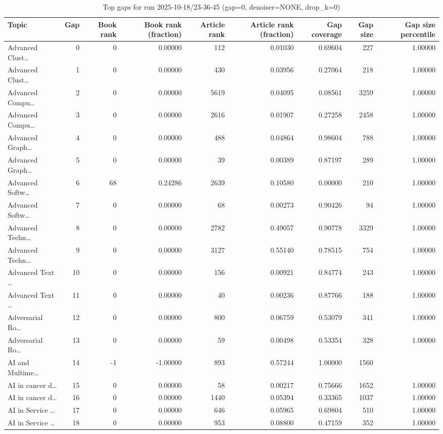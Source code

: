 \begin{table}
\caption{Top gaps for run 2025-10-18/23-36-45 (gap=0, denoiser=NONE, drop\_k=0)}
\label{tab:best_run_gap0_2025_10_18_23_36_45}
\begin{tabular}{lrrrrrrrr}
\toprule
Topic & Gap & Book rank & Book rank (fraction) & Article rank & Article rank (fraction) & Gap coverage & Gap size & Gap size percentile \\
\midrule
Advanced Clust… & 0 & 0 & 0.00000 & 112 & 0.01030 & 0.69604 & 227 & 1.00000 \\
Advanced Clust… & 1 & 0 & 0.00000 & 430 & 0.03956 & 0.27064 & 218 & 1.00000 \\
Advanced Compu… & 2 & 0 & 0.00000 & 5619 & 0.04095 & 0.08561 & 3259 & 1.00000 \\
Advanced Compu… & 3 & 0 & 0.00000 & 2616 & 0.01907 & 0.27258 & 2458 & 1.00000 \\
Advanced Graph… & 4 & 0 & 0.00000 & 488 & 0.04864 & 0.98604 & 788 & 1.00000 \\
Advanced Graph… & 5 & 0 & 0.00000 & 39 & 0.00389 & 0.87197 & 289 & 1.00000 \\
Advanced Softw… & 6 & 68 & 0.24286 & 2639 & 0.10580 & 0.00000 & 210 & 1.00000 \\
Advanced Softw… & 7 & 0 & 0.00000 & 68 & 0.00273 & 0.90426 & 94 & 1.00000 \\
Advanced Techn… & 8 & 0 & 0.00000 & 2782 & 0.49057 & 0.90778 & 3329 & 1.00000 \\
Advanced Techn… & 9 & 0 & 0.00000 & 3127 & 0.55140 & 0.78515 & 754 & 1.00000 \\
Advanced Text … & 10 & 0 & 0.00000 & 156 & 0.00921 & 0.84774 & 243 & 1.00000 \\
Advanced Text … & 11 & 0 & 0.00000 & 40 & 0.00236 & 0.87766 & 188 & 1.00000 \\
Adversarial Ro… & 12 & 0 & 0.00000 & 800 & 0.06759 & 0.53079 & 341 & 1.00000 \\
Adversarial Ro… & 13 & 0 & 0.00000 & 59 & 0.00498 & 0.53354 & 328 & 1.00000 \\
AI and Multime… & 14 & -1 & -1.00000 & 893 & 0.57244 & 1.00000 & 1560 &  \\
AI in cancer d… & 15 & 0 & 0.00000 & 58 & 0.00217 & 0.75666 & 1652 & 1.00000 \\
AI in cancer d… & 16 & 0 & 0.00000 & 1440 & 0.05394 & 0.33365 & 1037 & 1.00000 \\
AI in Service … & 17 & 0 & 0.00000 & 646 & 0.05965 & 0.69804 & 510 & 1.00000 \\
AI in Service … & 18 & 0 & 0.00000 & 953 & 0.08800 & 0.47159 & 352 & 1.00000 \\

\end{tabular}
\end{table}
